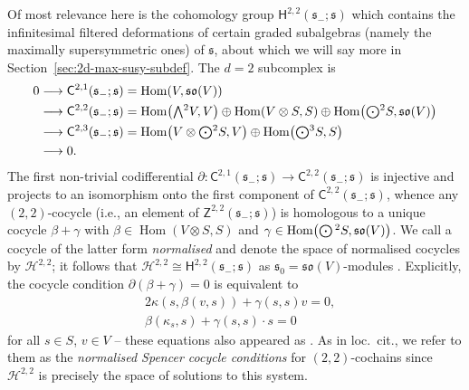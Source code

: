 \documentclass[10pt,a4paper]{amsart}
\numberwithin{equation}{section}
\newcommand{\fs}{\mathfrak{s}}
\newcommand{\fso}{\mathfrak{so}}
\newcommand{\cH}{\mathcal{H}}
\newcommand{\ssC}{\mathsf{C}}
\newcommand{\ssH}{\mathsf{H}}
\newcommand{\ssZ}{\mathsf{Z}}
\newcommand{\Wedge}{\mathchoice{{\textstyle\bigwedge}}{\bigwedge}{\bigwedge}{\bigwedge}}	%
\newcommand{\Odot}{\mathchoice{{\textstyle\bigodot}}{\bigodot}{\bigodot}{\bigodot}}
\newcommand{\1}{\mathbbm{1}}
\DeclareMathOperator{\Hom}{Hom}
\begin{document}
Of most relevance here is the cohomology group $\ssH^{2,2}(\fs_-;\fs)$ which contains the infinitesimal filtered deformations of certain graded subalgebras (namely the maximally supersymmetric ones) of $\fs$, about which we will say more in Section~\ref{sec:2d-max-susy-subdef}. The $d=2$ subcomplex is
\begin{align*}
	0 &\longrightarrow \ssC^{2,1}(\fs_-;\fs) = \Hom(V,\fso(V)) \\
	&\longrightarrow \ssC^{2,2}(\fs_-;\fs) = \Hom\bigl(\Wedge^2V,V\bigr)\oplus\Hom(V\otimes S,S)\oplus\Hom\bigl(\Odot^2S,\fso(V)\bigr)\\
	&\longrightarrow \ssC^{2,3}(\fs_-;\fs) = \Hom\bigl(V\otimes\Odot^2S,V\bigr)\oplus\Hom\bigl(\Odot^3S,S\bigr)\\
	&\longrightarrow 0.
\end{align*}
The first non-trivial codifferential $\partial\colon \ssC^{2,1}(\fs_-;\fs) \to \ssC^{2,2}(\fs_-;\fs)$ is injective and projects to an isomorphism onto the first component of $\ssC^{2,2}(\fs_-;\fs)$, whence any $(2,2)$-cocycle (i.e., an element of $\ssZ^{2,2}(\fs_-;\fs)$) is homologous to a unique cocycle $\beta+\gamma$ with $\beta\in\Hom(V\otimes S,S)$ and $\gamma\in\Hom\bigl(\Odot^2S,\fso(V)\bigr)$. We call a cocycle of the latter form \emph{normalised} and denote the space of normalised cocycles by $\cH^{2,2}$; it follows that $\cH^{2,2}\cong\ssH^{2,2}(\fs_-;\fs)$ as $\fs_0=\fso(V)$-modules \cite[Lemma~4.4]{Beckett2024_2}. Explicitly, the cocycle condition $\partial(\beta+\gamma)=0$ is equivalent to
\begin{align}
	&2\kappa(s,\beta(v,s)) + \gamma(s,s)v = 0, \label{eq:spencer-1}\\
	&\beta(\kappa_s,s) + \gamma(s,s)\cdot s = 0 \label{eq:spencer-2}
\end{align}
for all $s\in S$, $v\in V$ -- these equations also appeared as \cite[equations~(4.2) and (4.3)]{Beckett2024_2}. As in loc.\ cit., we refer to them as the \emph{normalised Spencer cocycle conditions} for $(2,2)$-cochains since $\cH^{2,2}$ is precisely the space of solutions to this system.
\end{document}
